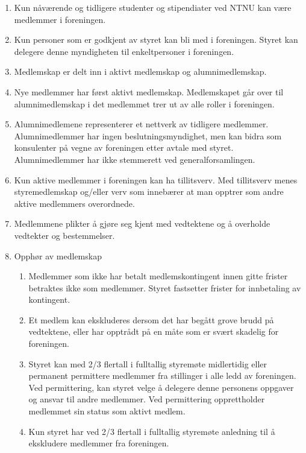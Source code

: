 \documentclass[a4paper,11pt,titlepage]{article}
\begin{document}
\begin{enumerate}
\item Kun nåværende og tidligere studenter og stipendiater ved NTNU kan være medlemmer i foreningen.
\item Kun personer som er godkjent av styret kan bli med i foreningen. Styret kan delegere denne myndigheten til enkeltpersoner i foreningen.
\item Medlemskap er delt inn i aktivt medlemskap og alumnimedlemskap. 
\item Nye medlemmer har først aktivt medlemskap. Medlemskapet går over til alumnimedlemskap i det medlemmet trer ut av alle roller i foreningen. 
\item Alumnimedlemene representerer et nettverk av tidligere medlemmer. Alumnimedlemmer har ingen beslutningsmyndighet, men kan bidra som konsulenter på vegne av foreningen etter avtale med styret. Alumnimedlemmer har ikke stemmerett ved generalforsamlingen.
\item Kun aktive medlemmer i foreningen kan ha tillitsverv. Med tillitsverv menes styremedlemskap og/eller verv som innebærer at man opptrer som andre aktive medlemmers overordnede.
\item Medlemmene plikter å gjøre seg kjent med vedtektene og å overholde vedtekter og bestemmelser.
\item Opphør av medlemskap
\begin{enumerate}
\item Medlemmer som ikke har betalt medlemskontingent innen gitte frister betraktes ikke som medlemmer. Styret fastsetter frister for innbetaling av kontingent.
\item Et medlem kan ekskluderes dersom det har begått grove brudd på vedtektene, eller har opptrådt på en måte som er svært skadelig for foreningen.
\item Styret kan med 2/3 flertall i fulltallig styremøte midlertidig eller permanent permittere medlemmer fra stillinger i alle ledd av foreningen. Ved permittering, kan styret velge å delegere denne personens oppgaver og ansvar til andre medlemmer. Ved permittering opprettholder medlemmet sin status som aktivt medlem.
\item Kun styret har ved 2/3 flertall i fulltallig styremøte anledning til å ekskludere medlemmer fra foreningen.
\end{enumerate}

\end{enumerate}
\end{document}
